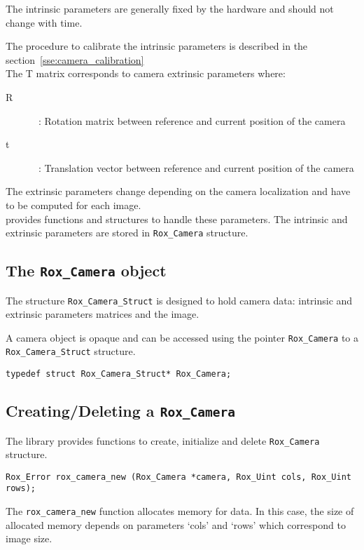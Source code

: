The intrinsic parameters are generally fixed by the hardware and should not change with time.

The procedure to calibrate the intrinsic parameters is described in the section~\ref{sse:camera_calibration}\\

The T matrix corresponds to camera extrinsic parameters where:
\begin{description}
   \item [R]~: Rotation matrix between reference and current position of the camera
   \item [t]~: Translation vector between reference and current position of the camera
\end{description}

The extrinsic parameters change depending on the camera localization and have to be computed for each image.\\

{\bf \rox} provides functions and structures to handle these parameters. The intrinsic and extrinsic parameters are stored in \lstinline$Rox_Camera$ structure.

\subsection{The {\tt Rox\_Camera} object}
\label{sse:camera_struct}

The structure \lstinline$Rox_Camera_Struct$ is designed to hold camera data: intrinsic and extrinsic parameters matrices and the image. 

A camera object is opaque and can be accessed using the pointer \lstinline$Rox_Camera$ to a \lstinline$Rox_Camera_Struct$ structure. 
\begin{lstlisting}
typedef struct Rox_Camera_Struct* Rox_Camera;
\end{lstlisting}

\subsection{Creating/Deleting a {\tt Rox\_Camera}}
\label{sse:camera_newdel}

The library provides functions to create, initialize and delete \lstinline$Rox_Camera$ structure.
\begin{lstlisting}
Rox_Error rox_camera_new (Rox_Camera *camera, Rox_Uint cols, Rox_Uint rows);
\end{lstlisting}
The \lstinline$rox_camera_new$ function allocates memory for data. In this case, the size of allocated memory depends on parameters `cols' and `rows' which correspond to image size. 

